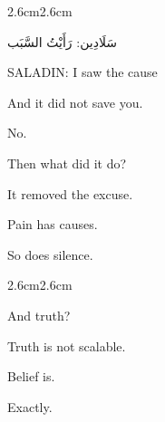 \begin{adjustwidth}{2.6cm}{2.6cm}

\begin{AR}
سَلَادِين: رَأَيْتُ السَّبَب
\end{AR}

\smallskip

SALADIN: I saw the cause

\vspace{1em}

 And it did not save you.

 No.

 Then what did it do?

 It removed the excuse.

\vspace{1em}



\vspace{1em}

 Pain has causes.

 So does silence.

\vspace{2em}

\end{adjustwidth}

\begin{adjustwidth}{2.6cm}{2.6cm}



\vspace{1em}

 And truth?

 Truth is not scalable.

 Belief is.

 Exactly.

\vspace{2em}

\end{adjustwidth}


